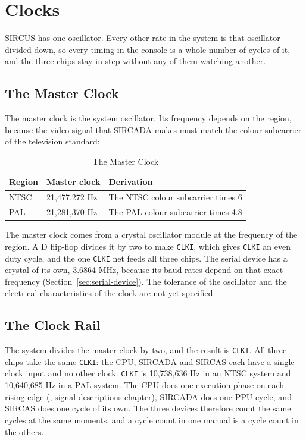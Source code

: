\chapter{Clocks}
\label{ch:clocks}

SIRCUS has one oscillator. Every other rate in the system is that oscillator divided down, so every timing in the
console is a whole number of cycles of it, and the three chips stay in step without any of them watching another.

\section{The Master Clock}
\label{sec:master-clock}

The master clock is the system oscillator. Its frequency depends on the region, because the video signal that SIRCADA
makes must match the colour subcarrier of the television standard:

\begin{table}[H]
	\centering
	\begin{tabular}{lll}
		\toprule
		\textbf{Region} & \textbf{Master clock} & \textbf{Derivation}                 \\
		\midrule
		NTSC            & 21,477,272 Hz         & The NTSC colour subcarrier times 6  \\
		PAL             & 21,281,370 Hz         & The PAL colour subcarrier times 4.8 \\
		\bottomrule
	\end{tabular}
	\caption{The Master Clock}
	\label{tab:master-clock}
\end{table}

The master clock comes from a crystal oscillator module at the frequency of the region. A D flip-flop divides it by two
to make \texttt{CLKI}, which gives \texttt{CLKI} an even duty cycle, and the one \texttt{CLKI} net feeds all three
chips. The serial device has a crystal of its own, 3.6864 MHz, because its baud rates depend on that exact frequency
(Section~\ref{sec:serial-device}). The tolerance of the oscillator and the electrical characteristics of the clock are
not yet specified.

\section{The Clock Rail}
\label{sec:clock-rail}

The system divides the master clock by two, and the result is \texttt{CLKI}. All three chips take the same
\texttt{CLKI}: the CPU, SIRCADA and SIRCAS each have a single clock input and no other clock. \texttt{CLKI} is
10,738,636 Hz in an NTSC system and 10,640,685 Hz in a PAL system. The CPU does one execution phase on each rising edge
(\hwmanual{}, signal descriptions chapter), SIRCADA does one PPU cycle, and SIRCAS does one cycle of its own. The three
devices therefore count the same cycles at the same moments, and a cycle count in one manual is a cycle count in the
others.

